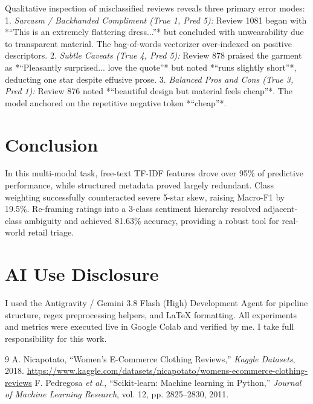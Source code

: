 \documentclass[10pt,conference,a4paper]{IEEEtran}
\begin{document}
Qualitative inspection of misclassified reviews reveals three primary error modes:
1. \emph{Sarcasm / Backhanded Compliment (True 1, Pred 5):} Review 1081 began with *``This is an extremely flattering dress...''* but concluded with unwearability due to transparent material. The bag-of-words vectorizer over-indexed on positive descriptors.
2. \emph{Subtle Caveats (True 4, Pred 5):} Review 878 praised the garment as *``Pleasantly surprised... love the quote''* but noted *``runs slightly short''*, deducting one star despite effusive prose.
3. \emph{Balanced Pros and Cons (True 3, Pred 1):} Review 876 noted *``beautiful design but material feels cheap''*. The model anchored on the repetitive negative token *``cheap''*.

\section{Conclusion}
In this multi-modal task, free-text TF-IDF features drove over 95\% of predictive performance, while structured metadata proved largely redundant. Class weighting successfully counteracted severe 5-star skew, raising Macro-F1 by 19.5\%. Re-framing ratings into a 3-class sentiment hierarchy resolved adjacent-class ambiguity and achieved 81.63\% accuracy, providing a robust tool for real-world retail triage.

\section*{AI Use Disclosure}
I used the Antigravity / Gemini 3.8 Flash (High) Development Agent for pipeline structure, regex preprocessing helpers, and LaTeX formatting. All experiments and metrics were executed live in Google Colab and verified by me. I take full responsibility for this work.

\begin{thebibliography}{9}
A. Nicapotato, ``Women's E-Commerce Clothing Reviews,'' \emph{Kaggle Datasets}, 2018. \url{https://www.kaggle.com/datasets/nicapotato/womens-ecommerce-clothing-reviews}
F. Pedregosa \emph{et al.}, ``Scikit-learn: Machine learning in Python,'' \emph{Journal of Machine Learning Research}, vol. 12, pp. 2825--2830, 2011.
\end{thebibliography}
\end{document}
